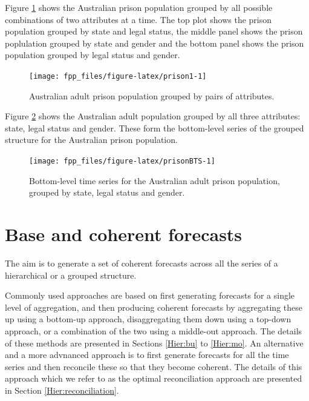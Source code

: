 \documentclass[]{book}
\begin{document}
Figure \ref{fig:prison1} shows the Australian prison population grouped by all possible combinations of two attributes at a time. The top plot shows the prison population grouped by state and legal status, the middle panel shows the prison poplulation grouped by state and gender and the bottom panel shows the prison population grouped by legal status and gender.

\begin{figure}

{\centering \texttt{[image: fpp\_files/figure-latex/prison1-1]} 

}

\caption{Australian adult prison population grouped by pairs of attributes.}\label{fig:prison1}
\end{figure}

Figure \ref{fig:prisonBTS} shows the Australian adult population grouped by all three attributes: state, legal status and gender. These form the bottom-level series of the grouped structure for the Australian prison population.

\begin{figure}

{\centering \texttt{[image: fpp\_files/figure-latex/prisonBTS-1]} 

}

\caption{Bottom-level time series for the Australian adult prison population, grouped by state, legal status and gender.}\label{fig:prisonBTS}
\end{figure}

\hypertarget{Hier:base-coherent-forecasts}{%
\section{Base and coherent forecasts}\label{Hier:base-coherent-forecasts}}

The aim is to generate a set of coherent forecasts across all the series of a hierarchical or a grouped structure.

Commonly used approaches are based on first generating forecasts for a single level of aggregation, and then producing coherent forecasts by aggregating these up using a bottom-up approach, disaggregating them down using a top-down approach, or a combination of the two using a middle-out approach. The details of these methods are presented in Sections \ref{Hier:bu} to \ref{Hier:mo}. An alternative and a more advnanced approach is to first generate forecasts for all the time series and then reconcile these so that they become coherent. The details of this approach which we refer to as the optimal reconciliation approach are presented in Section \ref{Hier:reconciliation}.
\end{document}
